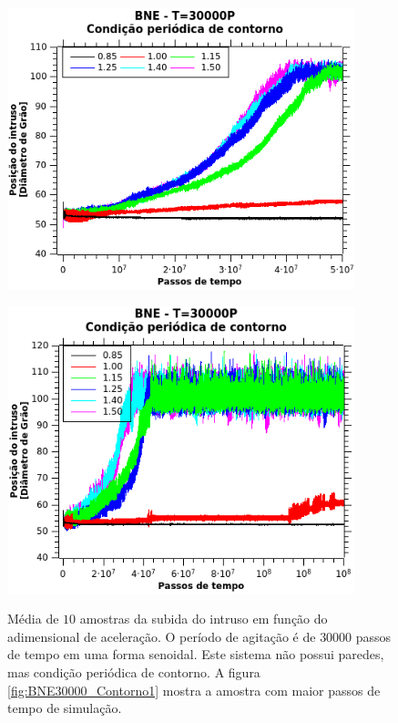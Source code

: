 \begin{figure}
    \centering
    \begin{minipage}{.45\linewidth}
        \includegraphics[width=0.9\textwidth]{04-figuras/BNE30000Contorno.png}
        \label{fig:BNE30000_Contorno_Media}
    \end{minipage}
    \begin{minipage}{.45\linewidth}
        \includegraphics[width=0.9\textwidth]{04-figuras/BNE30000Contorno1.png}
        \label{fig:BNE30000_Contorno1}
    \end{minipage}
    \caption{Média de $10$ amostras da subida do intruso em função do adimensional de aceleração. O período de agitação é de $30000$ passos de tempo em uma forma senoidal. Este sistema não possui paredes, mas condição periódica de contorno. A figura \ref{fig:BNE30000_Contorno1} mostra a amostra com maior passos de tempo de simulação.}
    \label{fig:BNE30000_Contorno}
\end{figure}

